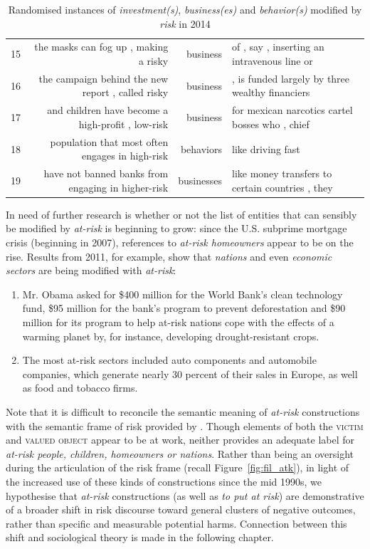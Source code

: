 \begin{table}
\begin{tabular}{lrrl}
15 &               the masks can fog up , making a risky  &     business &          of , say , inserting an intravenous line or \\
16 &   the campaign behind the new report , called risky  &     business &      , is funded largely by three wealthy financiers \\
17 &   and children have become a high-profit , low-risk  &     business &      for mexican narcotics cartel bosses who , chief \\
18 &     population that most often engages in high-risk  &    behaviors &                                    like driving fast \\
19 &  have not banned banks from engaging in higher-risk  &   businesses &     like money transfers to certain countries , they \\
\bottomrule
\end{tabular}
\caption{Randomised instances of \emph{investment(s)}, \emph{business(es)} and \emph{behavior(s)} modified by \emph{risk} in 2014}
\label{conc:investbusinessbehavior}
\end{table}

    In need of further research is whether or not the list of entities that can sensibly be modified by \emph{at-risk} is beginning to grow: since the U.S. subprime mortgage crisis (beginning in 2007), references to \emph{at-risk homeowners} appear to be on the rise. Results from 2011, for example, show that \emph{nations} and even \emph{economic sectors} are being modified with \emph{at-risk}:

    \begin{enumerate}  [before=\color{black}\ttfamily] \setlength\itemsep{0em} \small
    \item Mr. Obama asked for \$400 million for the World Bank's clean technology fund, \$95 million for the bank's program to prevent deforestation and \$90 million for its program to help at-risk nations cope with the effects of a warming planet by, for instance, developing drought-resistant crops.
    \item The most at-risk sectors included auto components and automobile companies, which generate nearly 30 percent of their sales in Europe, as well as food and tobacco firms.
    \end{enumerate}
    Note that it is difficult to reconcile the semantic meaning of \emph{at-risk} constructions with the semantic frame of risk provided by . Though elements of both the \textsc{victim} and \textsc{valued object} appear to be at work, neither provides an adequate label for \emph{at-risk people, children, homeowners or nations}. Rather than being an oversight during the articulation of the risk frame (recall Figure~\ref{fig:fil_atk}), in light of the increased use of these kinds of constructions since the mid 1990s, we hypothesise that \emph{at-risk} constructions (as well as \emph{to put at risk}) are demonstrative of a broader shift in risk discourse toward general clusters of negative outcomes, rather than specific and measurable potential harms. Connection between this shift and sociological theory is made in the following chapter.


